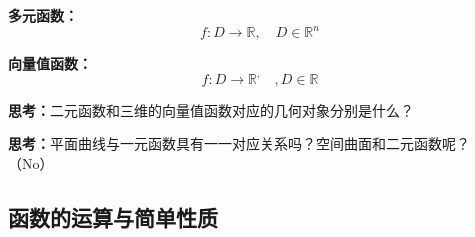 	\begin{shaded}
		{\bf 多元函数：} 
		$$f:D\to\mathbb{R},\quad D\in\mathbb{R}^n$$
		
		{\bf 向量值函数：}
		$$f:D\to\mathbb{R}^,\quad, D\in\mathbb{R}$$
		
		{\bf 思考：}二元函数和三维的向量值函数对应的几何对象分别是什么？
		
		{\bf 思考：}平面曲线与一元函数具有一一对应关系吗？空间曲面和二元函数呢？ （No）	
	\end{shaded}	
		\begin{center}
			\quad	
		\end{center}
	
\subsection{函数的运算与简单性质}

